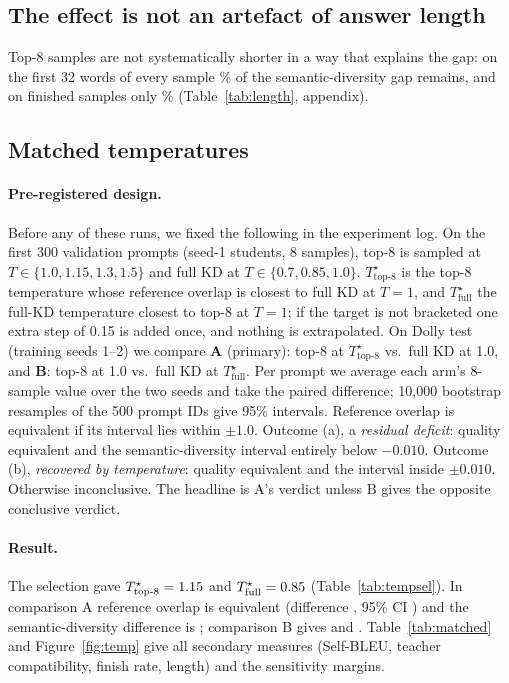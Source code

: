 \documentclass[11pt]{article}
\begin{document}


\subsection{The effect is not an artefact of answer length}\label{sec:length}
Top-8 samples are not systematically shorter in a way that explains the gap: on the first 32 words of every sample
\LenKeptFirst\% of the semantic-diversity gap remains, and on finished samples only \LenKeptFinished\%
(Table~\ref{tab:length}, appendix).

\subsection{Matched temperatures}\label{sec:temp}

\paragraph{Pre-registered design.} Before any of these runs, we fixed the following in the experiment log. On the
first 300 validation prompts (seed-1 students, 8 samples), top-8 is sampled at $T\in\{1.0,1.15,1.3,1.5\}$ and full
KD at $T\in\{0.7,0.85,1.0\}$. $T^\star_{\text{top-8}}$ is the top-8 temperature whose reference overlap is closest
to full KD at $T{=}1$, and $T^\star_{\text{full}}$ the full-KD temperature closest to top-8 at $T{=}1$; if the target
is not bracketed one extra step of 0.15 is added once, and nothing is extrapolated. On Dolly test (training seeds
1--2) we compare \textbf{A} (primary): top-8 at $T^\star_{\text{top-8}}$ vs.\ full KD at 1.0, and \textbf{B}: top-8 at
1.0 vs.\ full KD at $T^\star_{\text{full}}$. Per prompt we average each arm's 8-sample value over the two seeds and
take the paired difference; 10,000 bootstrap resamples of the 500 prompt IDs give 95\% intervals. Reference
overlap is equivalent if its interval lies within $\pm1.0$. Outcome (a), a \emph{residual deficit}: quality
equivalent and the semantic-diversity interval entirely below $-0.010$. Outcome (b), \emph{recovered by
temperature}: quality equivalent and the interval inside $\pm0.010$. Otherwise inconclusive. The headline is A's
verdict unless B gives the opposite conclusive verdict.



\paragraph{Result.} The selection gave $T^\star_{\text{top-8}}=1.15$ and $T^\star_{\text{full}}=0.85$
(Table~\ref{tab:tempsel}). In comparison A reference overlap is equivalent (difference \MatchAReferenceOverlap{},
95\% CI \MatchAReferenceOverlapCI{}) and the semantic-diversity difference is \MatchASemanticDiversity{}
\MatchASemanticDiversityCI{}; comparison B gives \MatchBReferenceOverlap{} \MatchBReferenceOverlapCI{} and
\MatchBSemanticDiversity{} \MatchBSemanticDiversityCI{}. Table~\ref{tab:matched} and Figure~\ref{fig:temp} give all
secondary measures (Self-BLEU, teacher compatibility, finish rate, length) and the sensitivity margins.
\end{document}
